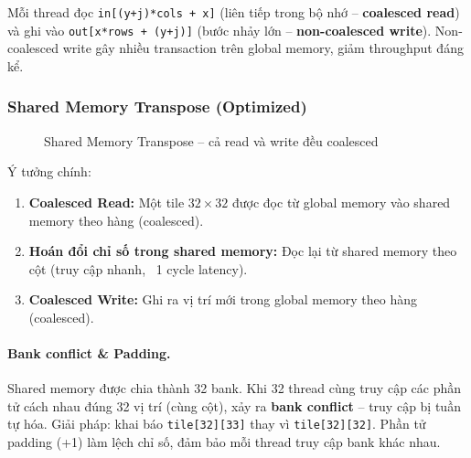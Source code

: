 \documentclass[12pt,a4paper]{article}
\begin{document}
Mỗi thread đọc \texttt{in[(y+j)*cols + x]} (liên tiếp trong bộ nhớ -- \textbf{coalesced read}) và ghi vào \texttt{out[x*rows + (y+j)]} (bước nhảy lớn -- \textbf{non-coalesced write}). Non-coalesced write gây nhiều transaction trên global memory, giảm throughput đáng kể.

\subsubsection{Shared Memory Transpose (Optimized)}

\begin{figure}[H]
\centering
{}
\caption{Shared Memory Transpose -- cả read và write đều coalesced}
\end{figure}

Ý tưởng chính:
\begin{enumerate}[leftmargin=2em]
    \item \textbf{Coalesced Read:} Một tile $32 \times 32$ được đọc từ global memory vào shared memory theo hàng (coalesced).
    \item \textbf{Hoán đổi chỉ số trong shared memory:} Đọc lại từ shared memory theo cột (truy cập nhanh, ~1 cycle latency).
    \item \textbf{Coalesced Write:} Ghi ra vị trí mới trong global memory theo hàng (coalesced).
\end{enumerate}

\paragraph{Bank conflict \& Padding.}
Shared memory được chia thành 32 bank. Khi 32 thread cùng truy cập các phần tử cách nhau đúng 32 vị trí (cùng cột), xảy ra \textbf{bank conflict} -- truy cập bị tuần tự hóa. Giải pháp: khai báo \texttt{tile[32][33]} thay vì \texttt{tile[32][32]}. Phần tử padding (+1) làm lệch chỉ số, đảm bảo mỗi thread truy cập bank khác nhau.
\end{document}
